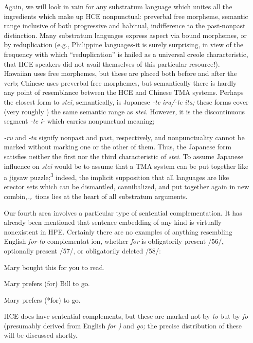Again, we will look in vain for any substratum language which unites all the ingredients which make up HCE nonpunctual: preverbal free morpheme, semantic range inclusive of both progressive and habi\-tual, indifference to the past-nonpast distinction. Many substratum languages express aspect via bound morphemes, or by reduplication (e.g., Philippine languages-it is surely surprising, in view of the fre\-quency with which ``reduplication'' is hailed as a universal creole characteristic, that HCE speakers did not avail themselves of this particular resource!). Hawaiian uses free morphemes, but these are placed both before and after the verb; Chinese uses preverbal free morphemes, but semantically there is hardly any point of resemblance between the HCE and Chinese TMA systems. Perhaps the closest form to \textit{stei,} semantically, is Japanese \textit{{}-te} \textit{iru/-te} \textit{ita;} these forms cover (very roughly ) the same semantic range as \textit{stei.} However, it is the discontinuous segment \textit{{}-te }\textit{i- }which carries nonpunctual meaning;

\textit{{}-ru} and \textit{{}-ta} signify nonpast and past, respectively, and nonpunctuality cannot be marked without marking one or the other of them. Thus, the Japanese form satisfies neither the first nor the third characteristic of \textit{stei.} To assume Japanese influence on \textit{stei} would be to assume that a TMA system can be put together like a jigsaw puzzle;\textsuperscript{3} indeed, the implicit supposition that all languages are like erector sets which can be dismantled, cannibalized, and put together again in new combin,.,. tions lies at the heart of all substratum arguments.

Our fourth area involves a particular type of sentential comple\-mentation. It has already been mentioned that sentence embedding of any kind is virtually nonexistent in HPE. Certainly there are no examples of anything resembling English \textit{for-to }complementat ion,
whether \textit{for} is obligatorily present /56/, optionally present /57/, or obligatorily deleted /58/:

\ea\label{ex:56}
Mary bought this for you to read.
\glt
\z

\ea\label{ex:57}
Mary prefers (for) Bill to go.
\glt
\z

\ea\label{ex:58}
Mary prefers (*for) to go.
\glt
\z

HCE does have sentential complements, but these are marked not by \textit{to} but by \textit{fo} (presumably derived from English \textit{for} \textit{)} and \textit{go;} the precise distribution of these will be discussed shortly.

